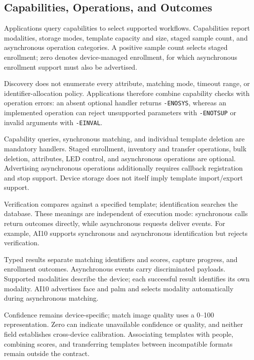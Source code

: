 \subsection{Capabilities, Operations, and Outcomes}

Applications query capabilities to select supported workflows. Capabilities report modalities, storage modes, template capacity and size, staged sample count, and asynchronous operation categories. A positive sample count selects staged enrollment; zero denotes device-managed enrollment, for which asynchronous enrollment support must also be advertised.

Discovery does not enumerate every attribute, matching mode, timeout range, or identifier-allocation policy. Applications therefore combine capability checks with operation errors: an absent optional handler returns \texttt{-ENOSYS}, whereas an implemented operation can reject unsupported parameters with \texttt{-ENOTSUP} or invalid arguments with \texttt{-EINVAL}.

Capability queries, synchronous matching, and individual template deletion are mandatory handlers. Staged enrollment, inventory and transfer operations, bulk deletion, attributes, LED control, and asynchronous operations are optional. Advertising asynchronous operations additionally requires callback registration and stop support. Device storage does not itself imply template import/export support.

Verification compares against a specified template; identification searches the database. These meanings are independent of execution mode: synchronous calls return outcomes directly, while asynchronous requests deliver events. For example, AI10 supports synchronous and asynchronous identification but rejects verification.

Typed results separate matching identifiers and scores, capture progress, and enrollment outcomes. Asynchronous events carry discriminated payloads. Supported modalities describe the device; each successful result identifies its own modality. AI10 advertises face and palm and selects modality automatically during asynchronous matching.

Confidence remains device-specific; match image quality uses a 0--100 representation. Zero can indicate unavailable confidence or quality, and neither field establishes cross-device calibration. Associating templates with people, combining scores, and transferring templates between incompatible formats remain outside the contract.

